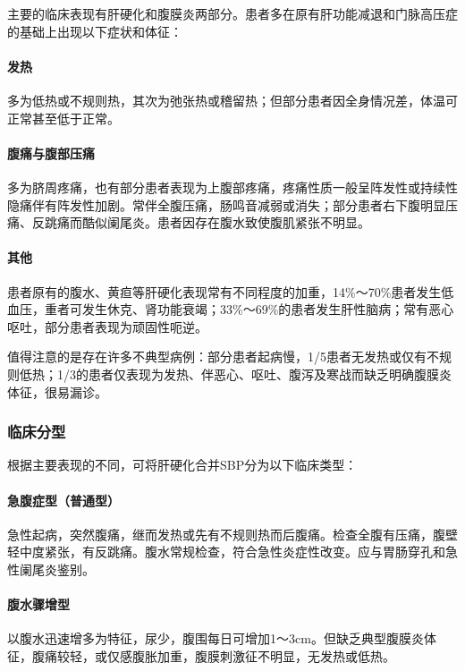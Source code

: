 主要的临床表现有肝硬化和腹膜炎两部分。患者多在原有肝功能减退和门脉高压症的基础上出现以下症状和体征：

\paragraph{发热}

多为低热或不规则热，其次为弛张热或稽留热；但部分患者因全身情况差，体温可正常甚至低于正常。

\paragraph{腹痛与腹部压痛}

多为脐周疼痛，也有部分患者表现为上腹部疼痛，疼痛性质一般呈阵发性或持续性隐痛伴有阵发性加剧。常伴全腹压痛，肠鸣音减弱或消失；部分患者右下腹明显压痛、反跳痛而酷似阑尾炎。患者因存在腹水致使腹肌紧张不明显。

\paragraph{其他}

患者原有的腹水、黄疸等肝硬化表现常有不同程度的加重，14\%～70\%患者发生低血压，重者可发生休克、肾功能衰竭；33\%～69\%的患者发生肝性脑病；常有恶心呕吐，部分患者表现为顽固性呃逆。

值得注意的是存在许多不典型病例：部分患者起病慢，1/5患者无发热或仅有不规则低热；1/3的患者仅表现为发热、伴恶心、呕吐、腹泻及寒战而缺乏明确腹膜炎体征，很易漏诊。

\subsubsection{临床分型}

根据主要表现的不同，可将肝硬化合并SBP分为以下临床类型：

\paragraph{急腹症型（普通型）}

急性起病，突然腹痛，继而发热或先有不规则热而后腹痛。检查全腹有压痛，腹壁轻中度紧张，有反跳痛。腹水常规检查，符合急性炎症性改变。应与胃肠穿孔和急性阑尾炎鉴别。

\paragraph{腹水骤增型}

以腹水迅速增多为特征，尿少，腹围每日可增加1～3cm。但缺乏典型腹膜炎体征，腹痛较轻，或仅感腹胀加重，腹膜刺激征不明显，无发热或低热。

